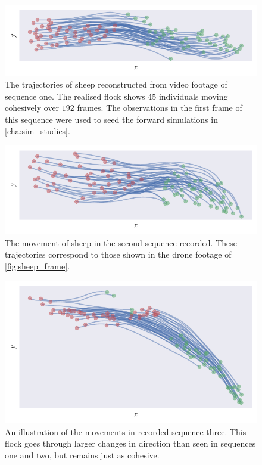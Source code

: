 \begin{figure}[tbp]
  \includegraphics{seq_1_traj.pdf}
  \caption{The trajectories of sheep reconstructed from video footage of
  sequence one. The realised flock shows $45$ individuals moving cohesively
  over $192$ frames. The observations in the first frame of this sequence were
  used to seed the forward simulations in \cref{cha:sim_studies}.}
  \label{fig:seq_1_traj}
\end{figure}
\begin{figure}[tbp]
  \includegraphics{seq_2_traj.pdf}
  \caption{The movement of sheep in the second sequence recorded. These
  trajectories correspond to those shown in the drone footage of
  \cref{fig:sheep_frame}.}
  \label{fig:seq_2_traj}
\end{figure}
\begin{figure}[tbp]
  \includegraphics{seq_3_traj.pdf}
  \caption{An illustration of the movements in recorded sequence three. This
  flock goes through larger changes in direction than seen in sequences
  one and two, but remains just as cohesive.}
  \label{fig:seq_3_traj}
\end{figure}

